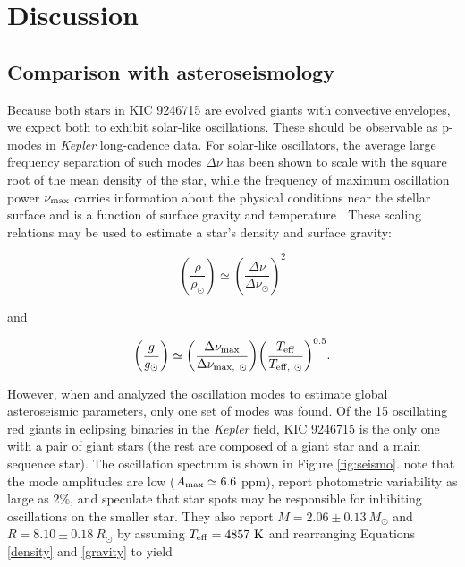\section{Discussion}\label{discuss}

\subsection{Comparison with asteroseismology}\label{seismo}

Because both stars in KIC 9246715 are evolved giants with convective envelopes, we expect both to exhibit solar-like oscillations. These should be observable as p-modes in \emph{Kepler} long-cadence data. For solar-like oscillators, the average large frequency separation of such modes $\Delta \nu$ has been shown to scale with the square root of the mean density of the star, while the frequency of maximum oscillation power $\nu_{\rm{max}}$ carries information about the physical conditions near the stellar surface and is a function of surface gravity and temperature \citep{cha13}. These scaling relations may be used to estimate a star's density and surface gravity:

\begin{equation} %
{\left( {\frac{\rho}{\rho_{\odot}}} \right)} \simeq {\left( {\frac{\Delta \nu}{\Delta \nu_{\odot}}} \right)}^{2}
\end{equation}

and

\begin{equation} %
{\left( \frac{g}{g_{\odot}} \right)} \simeq {\left( \frac{\Delta \nu_{\rm{max}}}{\Delta \nu_{\rm{max}, \ \odot}} \right)} {\left( \frac{T_{\rm{eff}}}{T_{\rm{eff}, \ \odot}} \right)}^{0.5}.
\end{equation}

However, when \citet{gau13} and \citet{gau14} analyzed the oscillation modes to estimate global asteroseismic parameters, only one set of modes was found. Of the 15 oscillating red giants in eclipsing binaries in the \emph{Kepler} field, KIC 9246715 is the only one with a pair of giant stars (the rest are composed of a giant star and a main sequence star). The oscillation spectrum is shown in Figure \ref{fig:seismo}. \citet{gau14} note that the mode amplitudes are low ($A_{\rm{max}} \simeq 6.6$ ppm), report photometric variability as large as 2\%, and speculate that star spots may be responsible for inhibiting oscillations on the smaller star. They also report $M = 2.06 \pm 0.13 \ M_{\odot}$ and $R = 8.10 \pm 0.18 \ R_{\odot}$ by assuming $T_{\rm{eff}} = 4857 \ \rm{K}$ and rearranging Equations \ref{density} and \ref{gravity} to yield


